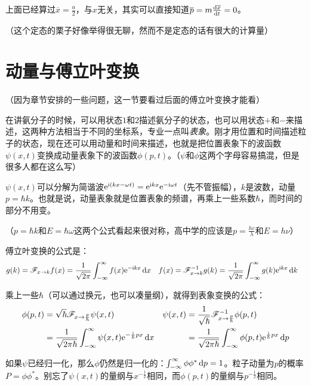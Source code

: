 上面已经算过$\overline{x}=\frac{a}{2}$，与$x$无关，其实可以直接知道$\overline{p}=m \frac{\mathop{}\!\mathrm{d} \overline{x}}{\mathop{}\!\mathrm{d} t}=0$。

（这个定态的栗子好像举得很无聊，然而不是定态的话有很大的计算量）
\section{动量与傅立叶变换}
（因为章节安排的一些问题，这一节要看过后面的傅立叶变换才能看）

在讲氨分子的时候，可以用状态$1$和$2$描述氨分子的状态，也可以用状态$+$和$-$来描述，这两种方法相当于不同的坐标系，专业一点叫\emph{表象}。刚才用位置和时间描述粒子的状态，现在还可以用动量和时间来描述，也就是把位置表象下的波函数$\psi(x,t)$变换成动量表象下的波函数$\phi(p,t)$。（$\psi$和$\phi$这两个字母容易搞混，但是很多人都在这么写）

$\psi(x,t)$可以分解为简谐波$\mathrm{e}^{\mathrm{i}(k x-\omega t)}=\mathrm{e}^{\mathrm{i} k x} \mathrm{e}^{-\mathrm{i} \omega t}$（先不管振幅），$k$是波数，动量$p=\hbar k$。也就是说，动量表象就是位置表象的频谱，再乘上一些系数$\hbar$，而时间的部分不用变。

（$p=\hbar k$和$E=\hbar \omega$这两个公式看起来很对称，高中学的应该是$p=\frac{h c}{\lambda}$和$E=h \nu$）

傅立叶变换的公式是：
\begin{align*}
g(k)&=\mathscr{F}_{x \rightarrow k} f(x)=\frac{1}{\sqrt{2 \pi}} \int_{-\infty}^{\infty} f(x) \mathrm{e}^{-\mathrm{i} k x} \mathop{}\!\mathrm{d} x &
f(x)&=\mathscr{F}^{-1}_{x \rightarrow k} g(k)=\frac{1}{\sqrt{2 \pi}} \int_{-\infty}^{\infty} g(k) \mathrm{e}^{\mathrm{i} k x} \mathop{}\!\mathrm{d} k
\end{align*}

乘上一些$\hbar$（可以通过换元，也可以凑量纲），就得到表象变换的公式：
\begin{align*}
\phi(p,t)&=\sqrt{\hbar} \mathscr{F}_{x \rightarrow \frac{p}{\hbar}} \psi(x,t) & \psi(x,t)&=\frac{1}{\sqrt{\hbar}} \mathscr{F}^{-1}_{x \rightarrow \frac{p}{\hbar}} \phi(p,t) \\
&=\frac{1}{\sqrt{2 \pi \hbar}} \int_{-\infty}^{\infty} \psi(x,t) \mathrm{e}^{-\frac{\mathrm{i}}{\hbar} p x} \mathop{}\!\mathrm{d} x & &=\frac{1}{\sqrt{2 \pi \hbar}} \int_{-\infty}^{\infty} \phi(p,t) \mathrm{e}^{\frac{\mathrm{i}}{\hbar} p x} \mathop{}\!\mathrm{d} p
\end{align*}

如果$\psi$已经归一化，那么$\phi$仍然是归一化的：$\int_{-\infty}^{\infty} \phi \phi^* \mathop{}\!\mathrm{d} p=1$。粒子动量为$p$的概率$P=\phi \phi^*$。别忘了$\psi(x,t)$的量纲与$x^{-\frac{1}{2}}$相同，而$\phi(p,t)$的量纲与$p^{-\frac{1}{2}}$相同。

